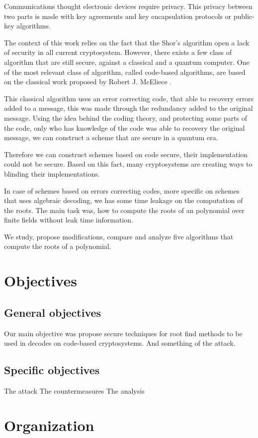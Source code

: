 Communications thought electronic devices require privacy. This privacy between two parts is made with key agreements and key encapsulation protocols or public-key algorithms. 

The context of this work relies on the fact that the Shor's algorithm open a lack of security in all current cryptosystem. However, there exists a few class of algorithm that are still secure, against a classical and a quantum computer. One of the most relevant class of algorithm, called code-based algorithms, are based on the classical work proposed by Robert J. McEliece \cite{mceliece1978public}. 

This classical algorithm uses an error correcting code, that able to recovery errors added to a message, this was made through the redundancy added to the original message. Using the idea behind the coding theory, and protecting some parts of the code, only who has knowledge of the code was able to recovery the original message, we can construct a scheme that are secure in a quantum era.

Therefore we can construct schemes based on code secure, their implementation could not be secure. Based on this fact, many cryptosystems are creating ways to blinding their implementations. 

In case of schemes based on errors correcting codes, more specific on schemes that uses algebraic decoding, we has some time leakage on the computation of the roots. The main task was, how to compute the roots of an polynomial over finite fields without leak time information. 

We study, propose modifications, compare and analyze five algorithms that compute the roots of a polynomial.


\section{Objectives}

\subsection{General objectives}
Our main objective was propose secure techniques for root find methods to be used in decodes on code-based cryptosystems. And something of the attack.
\subsection{Specific objectives}
The attack
The countermeasures
The analysis
\section{Organization}
